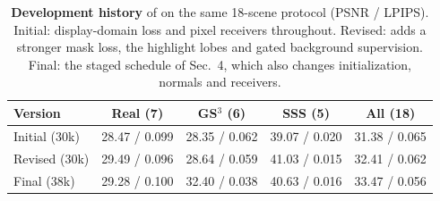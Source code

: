 \begin{table}[t]
\caption{\textbf{Development history} of \ours on the same 18-scene protocol (PSNR / LPIPS). Initial: display-domain loss and pixel receivers throughout. Revised: adds a stronger mask loss, the highlight lobes and gated background supervision. Final: the staged schedule of Sec.~4, which also changes initialization, normals and receivers.}
\label{tab:supp_history}
\centering\scriptsize
\setlength{\tabcolsep}{2.5pt}
\begin{tabular}{@{}lcccc@{}}
\toprule
Version & Real (7) & GS$^3$ (6) & SSS (5) & All (18) \\
\midrule
Initial (30k) & 28.47 / 0.099 & 28.35 / 0.062 & 39.07 / 0.020 & 31.38 / 0.065 \\
Revised (30k) & 29.49 / 0.096 & 28.64 / 0.059 & 41.03 / 0.015 & 32.41 / 0.062 \\
Final (38k) & 29.28 / 0.100 & 32.40 / 0.038 & 40.63 / 0.016 & 33.47 / 0.056 \\
\bottomrule
\end{tabular}
\end{table}
